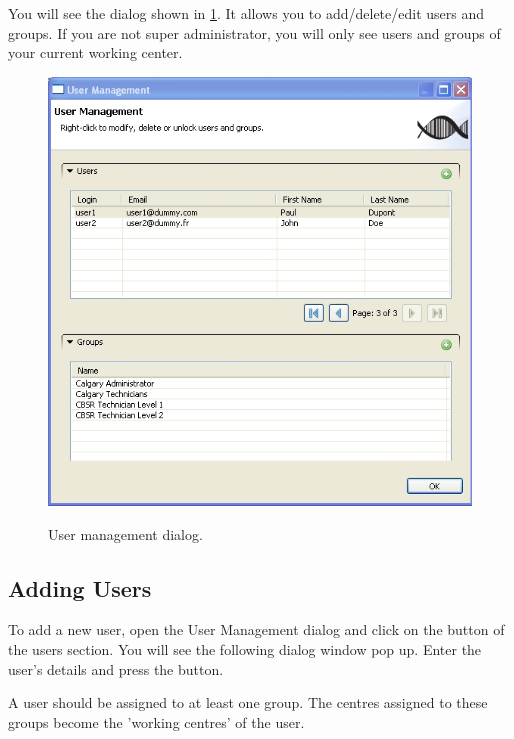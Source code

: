You will see the dialog shown in \ref{fig:user_management}. It allows you to 
add/delete/edit users and groups. If you are not super administrator, you will 
only see users and groups of your current working center.
\begin{figure}[H]
  \centering
  \scalebox{0.5}
	   { \includegraphics*{screenshots/administration/user_management} }
	   \caption{User management dialog.}
	   \label{fig:user_management}
\end{figure}

\subsection{Adding Users}
To add a new user, open the User Management dialog and click on the \fbox{+} button
of the users section. You will see the following dialog window pop up. Enter the 
user's details and press the  button.

A user should be assigned to at least one group. The centres assigned to these groups
become the 'working centres' of the user.

